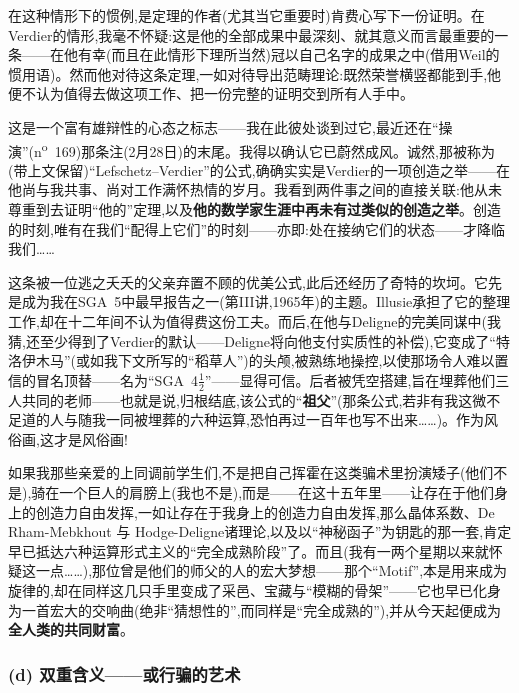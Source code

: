 在这种情形下的惯例,是定理的作者(尤其当它重要时)肯费心写下一份证明。在Verdier的情形,我毫不怀疑:这是他的全部成果中最深刻、就其意义而言最重要的一条——在他有幸(而且在此情形下理所当然)冠以自己名字的成果之中(借用Weil的惯用语)。然而他对待这条定理,一如对待导出范畴理论:既然荣誉横竖都能到手,他便不认为值得去做这项工作、把一份完整的证明交到所有人手中。

这是一个富有雄辩性的心态之标志——我在此彼处谈到过它,最近还在“操演”(n\textsuperscript{o}~169)那条注(2月28日)的末尾。我得以确认它已蔚然成风。诚然,那被称为(带上文保留)“Lefschetz--Verdier”的公式,确确实实是Verdier的一项创造之举——在他尚与我共事、尚对工作满怀热情的岁月。我看到两件事之间的直接关联:他从未尊重到去证明“他的”定理,以及\textbf{他的数学家生涯中再未有过类似的创造之举}。创造的时刻,唯有在我们“配得上它们”的时刻——亦即:处在接纳它们的状态——才降临我们……

这条被一位逃之夭夭的父亲弃置不顾的优美公式,此后还经历了奇特的坎坷。它先是成为我在SGA~5中最早报告之一(第III讲,1965年)的主题。Illusie承担了它的整理工作,却在十二年间不认为值得费这份工夫。而后,在他与Deligne的完美同谋中(我猜,还至少得到了Verdier的默认——Deligne将向他支付实质性的补偿),它变成了“特洛伊木马”(或如我下文所写的“稻草人”)的头颅,被熟练地操控,以使那场令人难以置信的冒名顶替——名为“SGA~4$\frac{1}{2}$”——显得可信。后者被凭空搭建,旨在埋葬他们三人共同的老师——也就是说,归根结底,该公式的“\textbf{祖父}”(那条公式,若非有我这微不足道的人与随我一同被埋葬的六种运算,恐怕再过一百年也写不出来……)。作为风俗画,这才是风俗画!

如果我那些亲爱的上同调前学生们,不是把自己挥霍在这类骗术里扮演矮子(他们不是),骑在一个巨人的\dmark{}肩膀上(我也不是),而是——在这十五年里——让存在于他们身上的创造力自由发挥,一如让存在于我身上的创造力自由发挥,那么晶体系数、De Rham-Mebkhout 与 Hodge-Deligne诸理论,以及以“神秘函子”为钥匙的那一套,肯定早已抵达六种运算形式主义的“完全成熟阶段”了。而且(我有一两个星期以来就怀疑这一点……),那位曾是他们的师父的人的宏大梦想——那个“Motif”,本是用来成为旋律的,却在同样这几只手里变成了采邑、宝藏与“模糊的骨架”——它也早已化身为一首宏大的交响曲(绝非“猜想性的”,而同样是“完全成熟的”),并从今天起便成为\textbf{全人类的共同财富}。

\subsubsection*{(d) 双重含义——或行骗的艺术}




